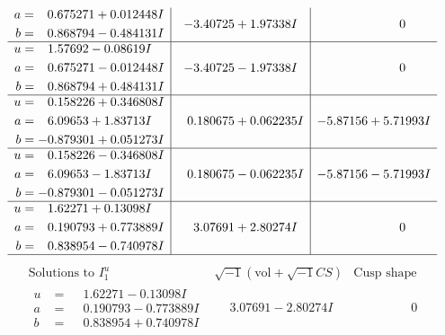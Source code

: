 \documentclass[1p]{elsarticle_modified}
\theoremstyle{definition}
\newcommand{\I}{\sqrt{-1}}
\begin{document}
$$\begin{array}{c|c|c}
\begin{aligned}
a &= \phantom{-}0.675271 + 0.012448 I \\
b &= \phantom{-}0.868794 - 0.484131 I\end{aligned}
 & -3.40725 + 1.97338 I & \phantom{-0.000000 } 0 \\ \hline\begin{aligned}
u &= \phantom{-}1.57692 - 0.08619 I \\
a &= \phantom{-}0.675271 - 0.012448 I \\
b &= \phantom{-}0.868794 + 0.484131 I\end{aligned}
 & -3.40725 - 1.97338 I & \phantom{-0.000000 } 0 \\ \hline\begin{aligned}
u &= \phantom{-}0.158226 + 0.346808 I \\
a &= \phantom{-}6.09653 + 1.83713 I \\
b &= -0.879301 + 0.051273 I\end{aligned}
 & \phantom{-}0.180675 + 0.062235 I & -5.87156 + 5.71993 I \\ \hline\begin{aligned}
u &= \phantom{-}0.158226 - 0.346808 I \\
a &= \phantom{-}6.09653 - 1.83713 I \\
b &= -0.879301 - 0.051273 I\end{aligned}
 & \phantom{-}0.180675 - 0.062235 I & -5.87156 - 5.71993 I \\ \hline\begin{aligned}
u &= \phantom{-}1.62271 + 0.13098 I \\
a &= \phantom{-}0.190793 + 0.773889 I \\
b &= \phantom{-}0.838954 - 0.740978 I\end{aligned}
 & \phantom{-}3.07691 + 2.80274 I & \phantom{-0.000000 } 0\\
 \hline 
 \end{array}$$\newpage$$\begin{array}{c|c|c}  
\text{Solutions to }I^u_{1}& \I (\text{vol} + \sqrt{-1}CS) & \text{Cusp shape}\\
 \hline 
\begin{aligned}
u &= \phantom{-}1.62271 - 0.13098 I \\
a &= \phantom{-}0.190793 - 0.773889 I \\
b &= \phantom{-}0.838954 + 0.740978 I\end{aligned}
 & \phantom{-}3.07691 - 2.80274 I & \phantom{-0.000000 } 0 \\ \hline\begin{aligned}

\end{aligned}
\end{array}$$
\end{document}
